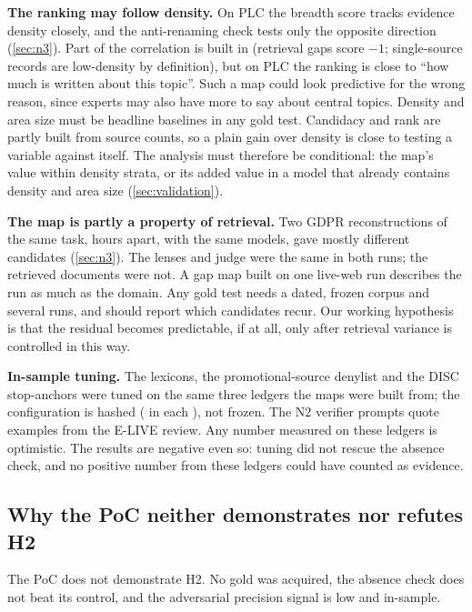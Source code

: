 \textbf{The ranking may follow density.} \evobs{} On PLC the breadth score tracks evidence density
closely, and the anti-renaming check tests only the opposite direction (\cref{sec:n3}). \evint{}
Part of the correlation is built in (retrieval gaps score $-1$; single-source records are
low-density by definition), but on PLC the ranking is close to \enquote{how much is written about
this topic}. Such a map could look predictive for the wrong reason, since experts may also have more
to say about central topics. Density and area size must be headline baselines in any gold test. Candidacy and rank are partly
built from source counts, so a plain gain over density is close to testing a variable against
itself. The analysis must therefore be conditional: the map's value within density strata, or its
added value in a model that already contains density and area size (\cref{sec:validation}).

\textbf{The map is partly a property of retrieval.} \evobs{} Two GDPR reconstructions of the same
task, hours apart, with the same models, gave mostly different candidates (\cref{sec:n3}). \evint{}
The lenses and judge were the same in both runs; the retrieved documents were not. A gap map built
on one live-web run describes the run as much as the domain. Any gold test needs a dated, frozen
corpus and several runs, and should report which candidates recur. \evhyp{} Our working hypothesis is
that the residual becomes predictable, if at all, only after retrieval variance is controlled in this
way.

\textbf{In-sample tuning.} \evobs{} The lexicons, the promotional-source denylist and the DISC
stop-anchors were tuned on the same three ledgers the maps were built from; the configuration is
hashed ( in each ), not frozen. The N2 verifier prompts quote
examples from the E-LIVE review. \evint{} Any number measured on these ledgers is optimistic. The
results are negative even so: tuning did not rescue the absence check, and no positive number from
these ledgers could have counted as evidence.

\subsection{Why the PoC neither demonstrates nor refutes H2}\label{sec:interp-h2}

The PoC does not demonstrate H2. No gold was acquired, the absence check does not beat its
control, and the adversarial precision signal is low and in-sample.

